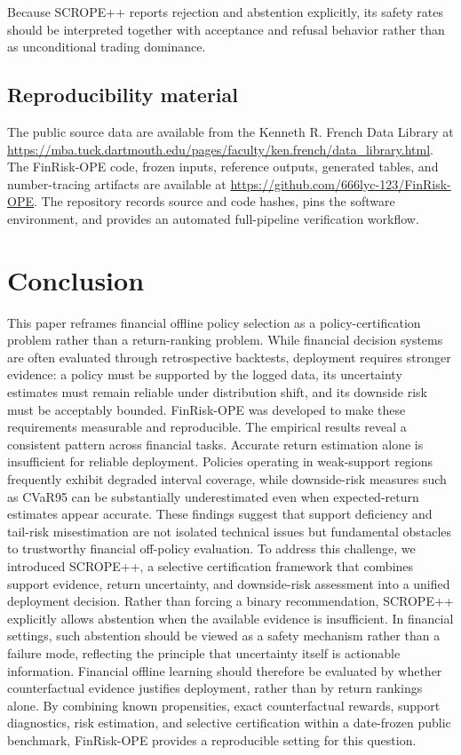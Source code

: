 \documentclass[conference]{IEEEtran}
\begin{document}

Because SCROPE++ reports rejection and abstention explicitly, its safety rates should be interpreted together with acceptance and refusal behavior rather than as unconditional trading dominance.

\subsection{Reproducibility material}

The public source data are available from the Kenneth R. French Data Library at \url{https://mba.tuck.dartmouth.edu/pages/faculty/ken.french/data_library.html}. The FinRisk-OPE code, frozen inputs, reference outputs, generated tables, and number-tracing artifacts are available at \url{https://github.com/666lyc-123/FinRisk-OPE}. The repository records source and code hashes, pins the software environment, and provides an automated full-pipeline verification workflow.

\section{Conclusion}

This paper reframes financial offline policy selection as a policy-certification problem rather than a return-ranking problem. While financial decision systems are often evaluated through retrospective backtests, deployment requires stronger evidence: a policy must be supported by the logged data, its uncertainty estimates must remain reliable under distribution shift, and its downside risk must be acceptably bounded. FinRisk-OPE was developed to make these requirements measurable and reproducible.
The empirical results reveal a consistent pattern across financial tasks. Accurate return estimation alone is insufficient for reliable deployment. Policies operating in weak-support regions frequently exhibit degraded interval coverage, while downside-risk measures such as CVaR95 can be substantially underestimated even when expected-return estimates appear accurate. These findings suggest that support deficiency and tail-risk misestimation are not isolated technical issues but fundamental obstacles to trustworthy financial off-policy evaluation.
To address this challenge, we introduced SCROPE++, a selective certification framework that combines support evidence, return uncertainty, and downside-risk assessment into a unified deployment decision. Rather than forcing a binary recommendation, SCROPE++ explicitly allows abstention when the available evidence is insufficient. In financial settings, such abstention should be viewed as a safety mechanism rather than a failure mode, reflecting the principle that uncertainty itself is actionable information.
Financial offline learning should therefore be evaluated by whether counterfactual evidence justifies deployment, rather than by return rankings alone. By combining known propensities, exact counterfactual rewards, support diagnostics, risk estimation, and selective certification within a date-frozen public benchmark, FinRisk-OPE provides a reproducible setting for this question.
\end{document}
